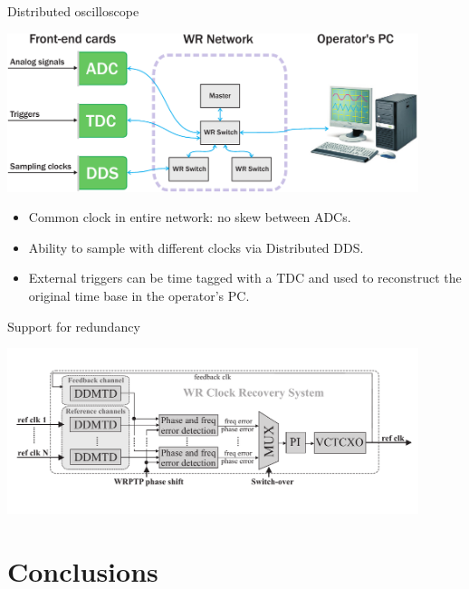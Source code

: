 \documentclass[compress, red]{beamer}
\begin{document}
\begin{frame}{Distributed oscilloscope}
 \begin{center}
   \includegraphics[width=0.9\textwidth]{../../figures/applications/distr_oscill.pdf}
   \end{center}
   \begin{block}{}
     \begin{itemize}
     \item Common clock in entire network: no skew between ADCs.
     \item Ability to sample with different clocks via Distributed DDS.
     \item External triggers can be time tagged with a TDC and used to reconstruct the original time base in the operator's 
PC.
     \end{itemize}
   \end{block}
\end{frame}

\begin{frame}{Support for redundancy}
 \begin{center}
   \includegraphics[width=0.9\textwidth]{../../figures/robustness/wrCRS.pdf}
   \end{center}
\end{frame}


\section{Conclusions}
\subsection{}
\end{document}
